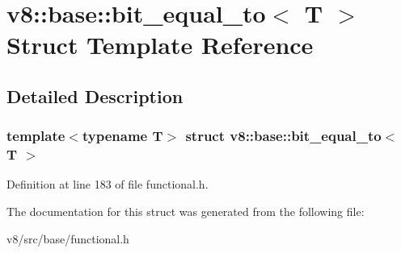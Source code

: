 \hypertarget{structv8_1_1base_1_1bit__equal__to}{}\section{v8\+:\+:base\+:\+:bit\+\_\+equal\+\_\+to$<$ T $>$ Struct Template Reference}
\label{structv8_1_1base_1_1bit__equal__to}


\subsection{Detailed Description}
\subsubsection*{template$<$typename T$>$\newline
struct v8\+::base\+::bit\+\_\+equal\+\_\+to$<$ T $>$}



Definition at line 183 of file functional.\+h.



The documentation for this struct was generated from the following file\+:\begin{DoxyCompactItemize}
\item 
v8/src/base/functional.\+h\end{DoxyCompactItemize}
